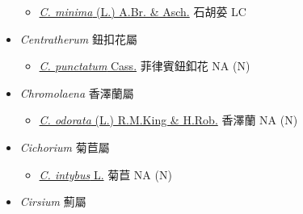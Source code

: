 \begin{itemize}
  \begin{itemize}
        \item[] \href{http://www.theplantlist.org/tpl1.1/search?q=Centipeda+minima}{\textit{C. minima} (L.) A.Br. \& Asch.}   石胡荽   LC
  \end{itemize}
 \item[] \textit{Centratherum} 鈕扣花屬
                                
  \begin{itemize}
        \item[] \href{http://www.theplantlist.org/tpl1.1/search?q=Centratherum+punctatum}{\textit{C. punctatum} Cass.}   菲律賓鈕釦花   NA (N)
  \end{itemize}
 \item[] \textit{Chromolaena} 香澤蘭屬
                                
  \begin{itemize}
        \item[] \href{http://www.theplantlist.org/tpl1.1/search?q=Chromolaena+odorata}{\textit{C. odorata} (L.) R.M.King \& H.Rob.}   香澤蘭   NA (N)
  \end{itemize}
 \item[] \textit{Cichorium} 菊苣屬
                                
  \begin{itemize}
        \item[] \href{http://www.theplantlist.org/tpl1.1/search?q=Cichorium+intybus}{\textit{C. intybus} L.}   菊苣   NA (N)
  \end{itemize}
 \item[] \textit{Cirsium} 薊屬
                                

\end{itemize}

